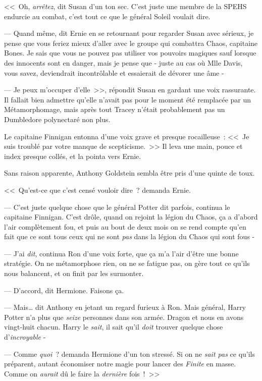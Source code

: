 <<~Oh, \emph{arrêtez}, dit Susan d'un ton sec. C'est juste une membre de la SPEHS endurcie au combat, c'est tout ce que le général Soleil voulait dire.

--- Quand même, dit Ernie en se retournant pour regarder Susan avec sérieux, je pense que vous feriez mieux d'aller avec le groupe qui combattra Chaos, capitaine Bones. Je sais que vous ne pouvez pas utiliser vos pouvoirs magiques sauf lorsque des innocents sont en danger, mais je pense que - juste au cas où Mlle Davis, vous savez, deviendrait incontrôlable et essaierait de dévorer une âme -

--- Je peux m'occuper d'elle~>>, répondit Susan en gardant une voix rassurante. Il fallait bien admettre qu'elle n'avait pas pour le moment été remplacée par un Métamorphomage, mais après tout Tracey n'était probablement pas un Dumbledore polynectaré non plus.

Le capitaine Finnigan entonna d'une voix grave et presque rocailleuse~: <<~Je suis troublé par votre manque de scepticisme.~>> Il leva une main, pouce et index presque collés, et la pointa vers Ernie.

Sans raison apparente, Anthony Goldstein sembla être pris d'une quinte de toux.

<<~Qu'est-ce que c'est censé vouloir dire~? demanda Ernie.

--- C'est juste quelque chose que le général Potter dit parfois, continua le capitaine Finnigan. C'est drôle, quand on rejoint la légion du Chaos, ça a d'abord l'air complètement fou, et puis au bout de deux mois on se rend compte qu'en fait que ce sont tous ceux qui ne sont \emph{pas} dans la légion du Chaos qui sont fous -

--- J'ai \emph{dit}, continua Ron d'une voix forte, que ça m'a l'air d'être une bonne stratégie. On ne métamorphose rien, on ne se fatigue pas, on gère tout ce qu'ils nous balancent, et on finit par les surmonter.

--- D'accord, dit Hermione. Faisons ça.

--- Mais… dit Anthony en jetant un regard furieux à Ron. Mais général, Harry Potter n'a plus que \emph{seize} personnes dans son armée. Dragon et nous en avons vingt-huit chacun. Harry le \emph{sait}, il sait qu'il \emph{doit} trouver quelque chose d'\emph{incroyable} -

--- Comme \emph{quoi}~? demanda Hermione d'un ton stressé. Si on ne \emph{sait pas} ce qu'ils préparent, autant économiser notre magie pour lancer des \emph{Finite} en masse. Comme on \emph{aurait} dû le faire la \emph{dernière} fois~!~>>

